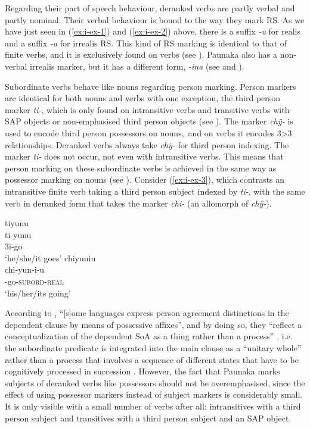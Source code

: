 Regarding their part of speech behaviour, deranked verbs are partly verbal and partly nominal. Their verbal behaviour is bound to the way they mark RS. As we have just seen in (\ref{ex:i-ex-1}) and (\ref{ex:i-ex-2}) above, there is a suffix \textit{-u} for realis and a suffix \textit{-a} for irrealis RS. This kind of RS marking is identical to that of finite verbs, and it is exclusively found on verbs (see ). Paunaka also has a non-verbal irrealis marker, but it has a different form, \textit{-ina} (see  and ). 

Subordinate verbs behave like nouns regarding person marking. Person markers are identical for both nouns and verbs with one exception, the third person marker \textit{ti-}, which is only found on intransitive verbs and transitive verbs with SAP objects or non-emphasised third person objects (see ). The marker \textit{chÿ-} is used to encode third person possessors on nouns,\ and on verbs it encodes 3>3 relationships. Deranked verbs always take \textit{chÿ-} for third person indexing. The marker \textit{ti-} does not occur, not even with intransitive verbs. This means that person marking on these subordinate verbs is achieved in the same way as possessor marking on nouns (see ).
Consider (\ref{ex:i-ex-3}), which contrasts an intransitive finite verb taking a third person subject indexed by \textit{ti-}, with the same verb in deranked form that takes the marker \textit{chi-} (an allomorph of \textit{chÿ-}).

\ea\label{ex:i-ex-3}
  \ea\label{ex:i-ex-3.1}
\begingl
\glpreamble tiyunu\\
\gla ti-yunu\\
\glb 3i-go\\
\glft ‘he/she/it goes’
\endgl
  \ex\label{ex:i-ex-3.2}
\begingl
\glpreamble chiyuniu\\
\gla chi-yun-i-u\\
-go-\textsc{subord}-\textsc{real}\\
\glft ‘his/her/its going’
\endgl
\z
\xe


According to \citet[69]{Cristofaro2003}, “[s]ome languages express person agreement distinctions in the dependent clause by means of possessive affixes”, and by doing so, they “reflect a conceptualization of the dependent SoA as a thing rather than a process” \citep[285]{Cristofaro2003}, i.e. the subordinate predicate is integrated into the main clause as a “unitary whole” rather than a process that involves a sequence of different states that have to be cognitively processed in succession \citep[262]{Cristofaro2003}.
However, the fact that Paunaka marks subjects of deranked verbs like possessors should not be overemphasised, since the effect of using possessor markers instead of subject markers is considerably small. It is only visible with a small number of verbs after all: intransitives with a third person subject and transitives with a third person subject and an SAP object. 

